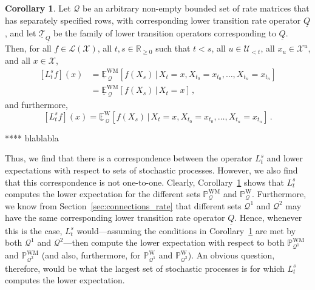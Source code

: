 \documentclass[10pt]{paper}
\theoremstyle{definition}
\newtheorem{corollary}[theorem]{Corollary}
\newcommand{\reals}{\mathbb{R}}
\newcommand{\realsnonneg}{\reals_{\geq 0}}
\newcommand{\states}{\mathcal{X}}
\newcommand{\processes}{\mathbb{P}}
\newcommand{\mprocesses}{\processes^{\mathrm{M}}}
\newcommand{\wprocesses}{\processes^{\mathrm{W}}}
\newcommand{\wmprocesses}{\processes^{\mathrm{WM}}}
\newcommand{\gambles}{\mathcal{L}}
\newcommand{\gamblesX}{\gambles(\states)}
\newcommand{\rateset}{\mathcal{Q}}
\newcommand{\lrate}{\underline{Q}}
\begin{document}
\begin{corollary}\label{cor:lower_operator_is_infimum}
Let $\rateset$ be an arbitrary non-empty bounded set of rate matrices that has separately specified rows, with corresponding lower transition rate operator $\lrate$, and let $\underline{\mathcal{T}}_{\lrate}$ be the family of lower transition operators corresponding to $\lrate$. Then, for all $f\in\gamblesX$, all $t,s\in\realsnonneg$ such that $t<s$, all $u\in\mathcal{U}_{<t}$, all $x_u\in\states^u$, and all $x\in\states$,
\begin{align*}
\left[L_t^sf\right](x) &= \underline{\mathbb{E}}^{\mathrm{WM}}_{\,\rateset}[f(X_s)\,\vert\,X_t=x,X_{t_0}=x_{t_0},\ldots,X_{t_n}=x_{t_n}] \\
 &= \underline{\mathbb{E}}^{\mathrm{WM}}_{\,\rateset}[f(X_s)\,\vert\,X_t=x]\,,%
\end{align*}
and furthermore,
\begin{equation*}
\left[L_t^sf\right](x) = \underline{\mathbb{E}}^{\mathrm{W}}_{\,\rateset}[f(X_s)\,\vert\,X_t=x,X_{t_0}=x_{t_0},\ldots,X_{t_n}=x_{t_n}]\,.%
\end{equation*}
\end{corollary}

**** blablabla

Thus, we find that there is a correspondence between the operator $L_t^s$ and lower expectations with respect to sets of stochastic processes. However, we also find that this correspondence is not one-to-one. Clearly, Corollary~\ref{cor:lower_operator_is_infimum} shows that $L_t^s$ computes the lower expectation for the different sets $\wmprocesses_\rateset$ and $\wprocesses_\rateset$. Furthermore, we know from Section~\ref{sec:connections_rate} that different sets $\rateset^1$ and $\rateset^2$ may have the same corresponding lower transition rate operator $\lrate$. Hence, whenever this is the case, $L_t^s$ would---assuming the conditions in Corollary~\ref{cor:lower_operator_is_infimum} are met by both $\rateset^1$ and $\rateset^2$---then compute the lower expectation with respect to both $\wmprocesses_{\rateset^1}$ and $\wmprocesses_{\rateset^2}$ (and also, furthermore, for $\wprocesses_{\rateset^1}$ and $\wprocesses_{\rateset^2}$). An obvious question, therefore, would be what the largest set of stochastic processes is for which $L_t^s$ computes the lower expectation.

%
%
\end{document}
